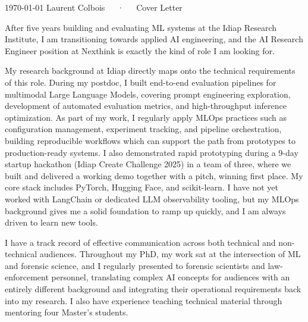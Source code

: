 \documentclass[11pt, a4paper]{awesome-cv}
\begin{document}
\makecvheader[R]

\makecvfooter
  {\today}
  {Laurent Colbois~~~·~~~Cover Letter}
  {}

\makelettertitle

\begin{cvletter}
After five years building and evaluating ML systems at the Idiap Research Institute, I am transitioning towards applied AI engineering, and the AI Research Engineer position at Nexthink is exactly the kind of role I am looking for.

My research background at Idiap directly maps onto the technical requirements of this role. During my postdoc, I built end-to-end evaluation pipelines for multimodal Large Language Models, covering prompt engineering exploration, development of automated evaluation metrics, and high-throughput inference optimization. As part of my work, I regularly apply MLOps practices such as configuration management, experiment tracking, and pipeline orchestration, building reproducible workflows which can support the path from prototypes to production-ready systems.  I also demonstrated rapid prototyping during a 9-day startup hackathon (Idiap Create Challenge 2025) in a team of three, where we built and delivered a working demo together with a pitch, winning first place. My core stack includes PyTorch, Hugging Face, and scikit-learn. I have not yet worked with LangChain or dedicated LLM observability tooling, but my MLOps background gives me a solid foundation to ramp up quickly, and I am always driven to learn new tools.

I have a track record of effective communication across both technical and non-technical audiences. Throughout my PhD, my work sat at the intersection of ML and forensic science, and I regularly presented to forensic scientists and law-enforcement personnel, translating complex AI concepts for audiences with an entirely different background and integrating their operational requirements back into my research. I also have experience teaching technical material through mentoring four Master's students.


\end{cvletter}
\end{document}
